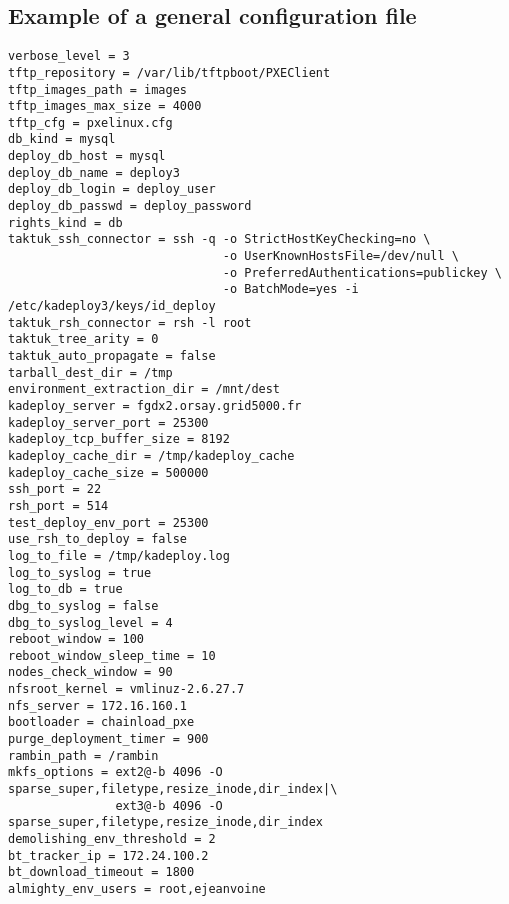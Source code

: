 \documentclass[a4wide,10pt,oneside]{book}
\begin{document}
\subsection{Example of a general configuration file}
\begin{small}
\begin{verbatim}
verbose_level = 3
tftp_repository = /var/lib/tftpboot/PXEClient
tftp_images_path = images
tftp_images_max_size = 4000
tftp_cfg = pxelinux.cfg
db_kind = mysql
deploy_db_host = mysql
deploy_db_name = deploy3
deploy_db_login = deploy_user
deploy_db_passwd = deploy_password
rights_kind = db
taktuk_ssh_connector = ssh -q -o StrictHostKeyChecking=no \
                              -o UserKnownHostsFile=/dev/null \
                              -o PreferredAuthentications=publickey \
                              -o BatchMode=yes -i /etc/kadeploy3/keys/id_deploy
taktuk_rsh_connector = rsh -l root
taktuk_tree_arity = 0
taktuk_auto_propagate = false
tarball_dest_dir = /tmp
environment_extraction_dir = /mnt/dest
kadeploy_server = fgdx2.orsay.grid5000.fr
kadeploy_server_port = 25300
kadeploy_tcp_buffer_size = 8192
kadeploy_cache_dir = /tmp/kadeploy_cache
kadeploy_cache_size = 500000
ssh_port = 22
rsh_port = 514
test_deploy_env_port = 25300
use_rsh_to_deploy = false
log_to_file = /tmp/kadeploy.log
log_to_syslog = true
log_to_db = true
dbg_to_syslog = false
dbg_to_syslog_level = 4
reboot_window = 100
reboot_window_sleep_time = 10
nodes_check_window = 90
nfsroot_kernel = vmlinuz-2.6.27.7
nfs_server = 172.16.160.1
bootloader = chainload_pxe
purge_deployment_timer = 900
rambin_path = /rambin
mkfs_options = ext2@-b 4096 -O sparse_super,filetype,resize_inode,dir_index|\
               ext3@-b 4096 -O sparse_super,filetype,resize_inode,dir_index
demolishing_env_threshold = 2
bt_tracker_ip = 172.24.100.2
bt_download_timeout = 1800
almighty_env_users = root,ejeanvoine
\end{verbatim}
\end{small}
\end{document}

